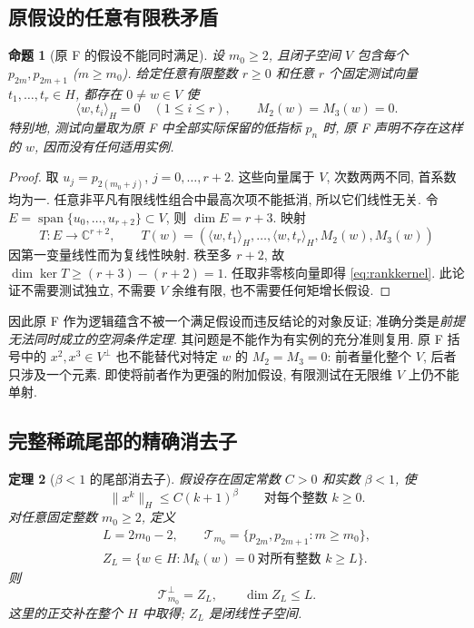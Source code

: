 \documentclass[UTF8,11pt]{ctexart}
\newtheorem{theorem}{定理}[section]
\newtheorem{proposition}[theorem]{命题}
\theoremstyle{definition}
\DeclareMathOperator{\Span}{span}
\newcommand{\ip}[2]{\langle #1,#2\rangle_H}
\begin{document}
\subsection{原假设的任意有限秩矛盾}

\begin{proposition}[原 F 的假设不能同时满足]\label{prop:vacuous}
设 $m_0\geq2$, 且闭子空间 $V$ 包含每个 $p_{2m},p_{2m+1}$ ($m\geq m_0$).
给定任意有限整数 $r\geq0$ 和任意 $r$ 个固定测试向量 $t_1,\ldots,t_r\in H$,
都存在 $0\ne w\in V$ 使
\begin{equation}\label{eq:rankkernel}
 \ip{w}{t_i}=0\quad(1\leq i\leq r),\qquad M_2(w)=M_3(w)=0.
\end{equation}
特别地, 测试向量取为原 F 中全部实际保留的低指标 $p_n$ 时,
原 F 声明不存在这样的 $w$, 因而没有任何适用实例.
\end{proposition}

\begin{proof}
取 $u_j=p_{2(m_0+j)}$, $j=0,\ldots,r+2$.
这些向量属于 $V$, 次数两两不同, 首系数均为一.
任意非平凡有限线性组合中最高次项不能抵消, 所以它们线性无关.
令 $E=\Span\{u_0,\ldots,u_{r+2}\}\subset V$, 则 $\dim E=r+3$.
映射
\[
 T:E\longrightarrow\mathbb C^{r+2},\qquad
 T(w)=(\ip{w}{t_1},\ldots,\ip{w}{t_r},M_2(w),M_3(w))
\]
因第一变量线性而为复线性映射. 秩至多 $r+2$, 故
$\dim\ker T\geq(r+3)-(r+2)=1$. 任取非零核向量即得 \eqref{eq:rankkernel}.
此论证不需要测试独立, 不需要 $V$ 余维有限, 也不需要任何矩增长假设.
\end{proof}

因此原 F 作为逻辑蕴含不被一个满足假设而违反结论的对象反证;
准确分类是\emph{前提无法同时成立的空洞条件定理}.
其问题是不能作为有实例的充分准则复用.
原 F 括号中的 $x^2,x^3\in V^\perp$ 也不能替代对特定 $w$ 的 $M_2=M_3=0$:
前者量化整个 $V$, 后者只涉及一个元素.
即使将前者作为更强的附加假设, 有限测试在无限维 $V$ 上仍不能单射.

\subsection{完整稀疏尾部的精确消去子}

\begin{theorem}[$\beta<1$ 的尾部消去子]\label{thm:tail}
假设存在固定常数 $C>0$ 和实数 $\beta<1$, 使
\begin{equation}\label{eq:sublinear}
 \|x^k\|_H\leq C(k+1)^\beta\qquad\text{对每个整数 }k\geq0.
\end{equation}
对任意固定整数 $m_0\geq2$, 定义
\begin{equation}\label{eq:ztail}
 \begin{gathered}
 L=2m_0-2,\qquad \mathcal T_{m_0}=\{p_{2m},p_{2m+1}:m\geq m_0\},\\
 Z_L=\{w\in H:M_k(w)=0\ \text{对所有整数 }k\geq L\}.
 \end{gathered}
\end{equation}
则
\begin{equation}\label{eq:tailequality}
 \mathcal T_{m_0}^{\perp}=Z_L,\qquad \dim Z_L\leq L.
\end{equation}
这里的正交补在整个 $H$ 中取得; $Z_L$ 是闭线性子空间.
\end{theorem}
\end{document}
